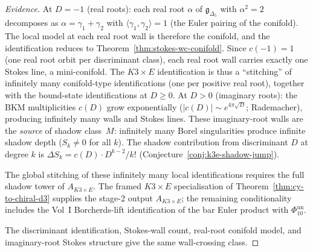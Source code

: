 \begin{proof}[Evidence]
At $D = -1$ \textup{(}real roots\textup{)}: each real root $\alpha$ of $\mathfrak{g}_{\Delta_5}$ with $\alpha^2 = 2$ decomposes as $\alpha = \gamma_1 + \gamma_2$ with $\langle \gamma_1, \gamma_2 \rangle = 1$ (the Euler pairing of the conifold). The local model at each real root wall is therefore the conifold, and the identification reduces to Theorem~\ref{thm:stokes-wc-conifold}. Since $c(-1) = 1$ (one real root orbit per discriminant class), each real root wall carries exactly one Stokes line, a mini-conifold. The $K3 \times E$ identification is thus a ``stitching'' of infinitely many conifold-type identifications (one per positive real root), together with the bound-state identifications at $D \geq 0$.
At $D > 0$ \textup{(}imaginary roots\textup{)}: the BKM multiplicities $c(D)$ grow exponentially ($|c(D)| \sim e^{4\pi\sqrt{D}}$; Rademacher), producing infinitely many walls and Stokes lines. These imaginary-root walls are the \emph{source} of shadow class~$M$: infinitely many Borel singularities produce infinite shadow depth ($S_k \neq 0$ for all $k$). The shadow contribution from discriminant $D$ at degree $k$ is $\Delta S_k = c(D) \cdot D^{k-2}/k!$ (Conjecture~\ref{conj:k3e-shadow-jump}).

The global stitching of these infinitely many local identifications requires the full shadow tower of $A_{K3 \times E}$. The framed $K3\times E$ specialisation of Theorem~\ref{thm:cy-to-chiral-d3} supplies the stage-2 output $A_{K3 \times E}$; the remaining conditionality includes the Vol~I Borcherds-lift identification of the bar Euler product with $\Phi_{10}^{\mathrm{un}}$.

\smallskip\noindent The discriminant identification, Stokes-wall count, real-root conifold model, and imaginary-root Stokes structure give the same wall-crossing class.
\end{proof}

